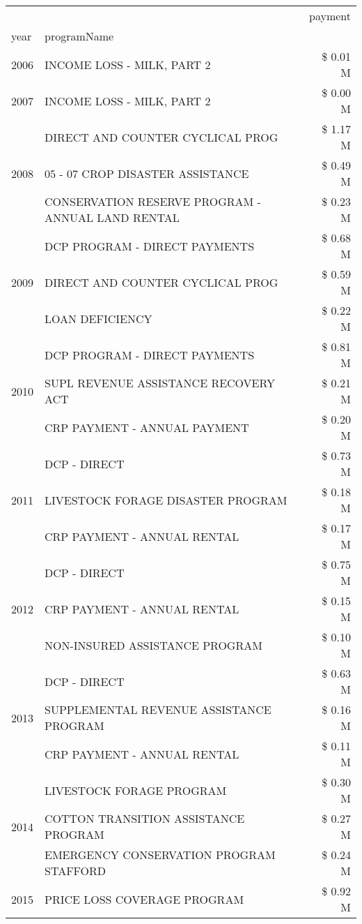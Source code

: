 \begin{tabular}{llr}
\toprule
 &  & payment \\
year & programName &  \\
\midrule
2006 & INCOME LOSS - MILK, PART 2 & \$ 0.01 M \\
\cline{1-3}
2007 & INCOME LOSS - MILK, PART 2 & \$ 0.00 M \\
\cline{1-3}
\multirow[t]{3}{*}{2008} & DIRECT AND COUNTER CYCLICAL PROG & \$ 1.17 M \\
 & 05 - 07 CROP DISASTER ASSISTANCE & \$ 0.49 M \\
 & CONSERVATION RESERVE PROGRAM - ANNUAL LAND RENTAL & \$ 0.23 M \\
\cline{1-3}
\multirow[t]{3}{*}{2009} & DCP PROGRAM - DIRECT PAYMENTS & \$ 0.68 M \\
 & DIRECT AND COUNTER CYCLICAL PROG & \$ 0.59 M \\
 & LOAN DEFICIENCY & \$ 0.22 M \\
\cline{1-3}
\multirow[t]{3}{*}{2010} & DCP PROGRAM - DIRECT PAYMENTS & \$ 0.81 M \\
 & SUPL REVENUE ASSISTANCE RECOVERY ACT & \$ 0.21 M \\
 & CRP PAYMENT - ANNUAL PAYMENT & \$ 0.20 M \\
\cline{1-3}
\multirow[t]{3}{*}{2011} & DCP - DIRECT & \$ 0.73 M \\
 & LIVESTOCK FORAGE DISASTER PROGRAM & \$ 0.18 M \\
 & CRP PAYMENT - ANNUAL RENTAL & \$ 0.17 M \\
\cline{1-3}
\multirow[t]{3}{*}{2012} & DCP - DIRECT & \$ 0.75 M \\
 & CRP PAYMENT - ANNUAL RENTAL & \$ 0.15 M \\
 & NON-INSURED ASSISTANCE PROGRAM & \$ 0.10 M \\
\cline{1-3}
\multirow[t]{3}{*}{2013} & DCP - DIRECT & \$ 0.63 M \\
 & SUPPLEMENTAL REVENUE ASSISTANCE PROGRAM & \$ 0.16 M \\
 & CRP PAYMENT - ANNUAL RENTAL & \$ 0.11 M \\
\cline{1-3}
\multirow[t]{3}{*}{2014} & LIVESTOCK FORAGE PROGRAM & \$ 0.30 M \\
 & COTTON TRANSITION ASSISTANCE PROGRAM & \$ 0.27 M \\
 & EMERGENCY CONSERVATION PROGRAM STAFFORD & \$ 0.24 M \\
\cline{1-3}
\multirow[t]{3}{*}{2015} & PRICE LOSS COVERAGE PROGRAM & \$ 0.92 M \\

\end{tabular}
